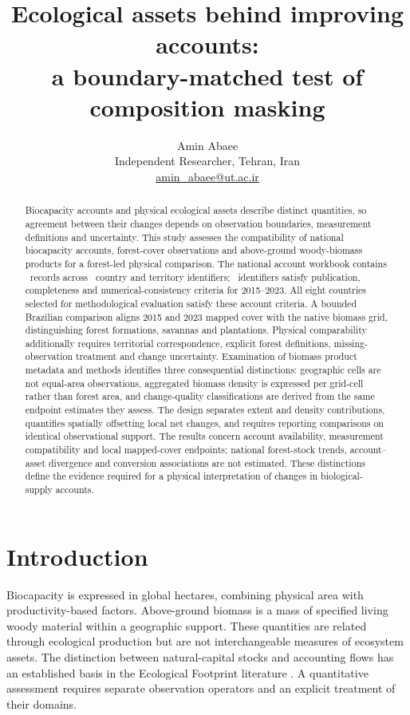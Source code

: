 \documentclass[11pt,a4paper]{article}
\title{Ecological assets behind improving accounts:\\a boundary-matched test of composition masking}
\author{Amin Abaee\\\small Independent Researcher, Tehran, Iran\\\small\href{mailto:amin_abaee@ut.ac.ir}{amin\_abaee@ut.ac.ir}}
\date{}
\begin{document}
\maketitle
\begin{abstract}
Biocapacity accounts and physical ecological assets describe distinct quantities, so agreement between their changes depends on observation boundaries, measurement definitions and uncertainty. This study assesses the compatibility of national biocapacity accounts, forest-cover observations and above-ground woody-biomass products for a forest-led physical comparison. The national account workbook contains \NationalRows\ records across \CountryIDs\ country and territory identifiers; \AccountPass\ identifiers satisfy publication, completeness and numerical-consistency criteria for 2015--2023. All eight countries selected for methodological evaluation satisfy these account criteria. A bounded Brazilian comparison aligns 2015 and 2023 mapped cover with the native biomass grid, distinguishing forest formations, savannas and plantations. Physical comparability additionally requires territorial correspondence, explicit forest definitions, missing-observation treatment and change uncertainty. Examination of biomass product metadata and methods identifies three consequential distinctions: geographic cells are not equal-area observations, aggregated biomass density is expressed per grid-cell rather than forest area, and change-quality classifications are derived from the same endpoint estimates they assess. The design separates extent and density contributions, quantifies spatially offsetting local net changes, and requires reporting comparisons on identical observational support. The results concern account availability, measurement compatibility and local mapped-cover endpoints; national forest-stock trends, account--asset divergence and conversion associations are not estimated. These distinctions define the evidence required for a physical interpretation of changes in biological-supply accounts.
\end{abstract}

\section{Introduction}
Biocapacity is expressed in global hectares, combining physical area with productivity-based factors. Above-ground biomass is a mass of specified living woody material within a geographic support. These quantities are related through ecological production but are not interchangeable measures of ecosystem assets. The distinction between natural-capital stocks and accounting flows has an established basis in the Ecological Footprint literature \citep{Mancini2017}. A quantitative assessment requires separate observation operators and an explicit treatment of their domains.
\end{document}
